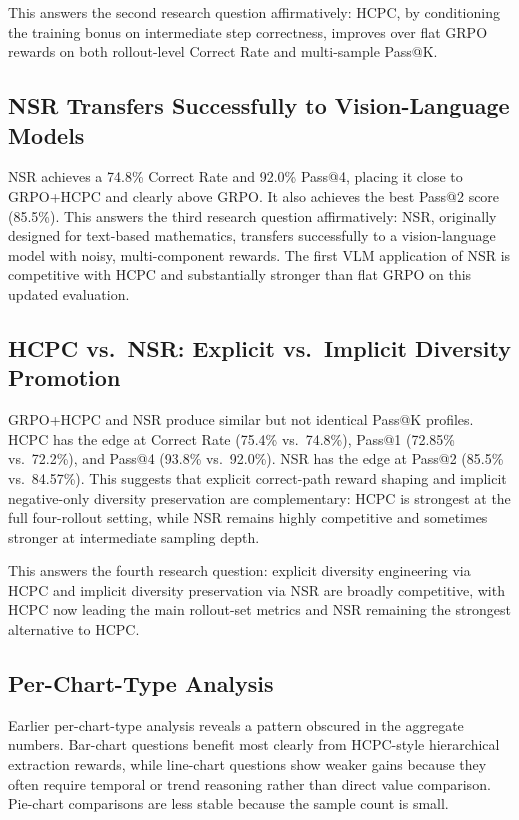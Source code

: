 \documentclass{iutbscthesis}
\begin{document}
This answers the second research question affirmatively: HCPC, by conditioning the training bonus on intermediate step correctness, improves over flat GRPO rewards on both rollout-level Correct Rate and multi-sample Pass@K.

\subsection{NSR Transfers Successfully to Vision-Language Models}

NSR achieves a 74.8\% Correct Rate and 92.0\% Pass@4, placing it close to GRPO+HCPC and clearly above GRPO. It also achieves the best Pass@2 score (85.5\%). This answers the third research question affirmatively: NSR, originally designed for text-based mathematics, transfers successfully to a vision-language model with noisy, multi-component rewards. The first VLM application of NSR is competitive with HCPC and substantially stronger than flat GRPO on this updated evaluation.

\subsection{HCPC vs.\ NSR: Explicit vs.\ Implicit Diversity Promotion}

GRPO+HCPC and NSR produce similar but not identical Pass@K profiles. HCPC has the edge at Correct Rate (75.4\% vs.\ 74.8\%), Pass@1 (72.85\% vs.\ 72.2\%), and Pass@4 (93.8\% vs.\ 92.0\%). NSR has the edge at Pass@2 (85.5\% vs.\ 84.57\%). This suggests that explicit correct-path reward shaping and implicit negative-only diversity preservation are complementary: HCPC is strongest at the full four-rollout setting, while NSR remains highly competitive and sometimes stronger at intermediate sampling depth.

This answers the fourth research question: explicit diversity engineering via HCPC and implicit diversity preservation via NSR are broadly competitive, with HCPC now leading the main rollout-set metrics and NSR remaining the strongest alternative to HCPC.

\subsection{Per-Chart-Type Analysis}

Earlier per-chart-type analysis reveals a pattern obscured in the aggregate numbers. Bar-chart questions benefit most clearly from HCPC-style hierarchical extraction rewards, while line-chart questions show weaker gains because they often require temporal or trend reasoning rather than direct value comparison. Pie-chart comparisons are less stable because the sample count is small.
\end{document}
